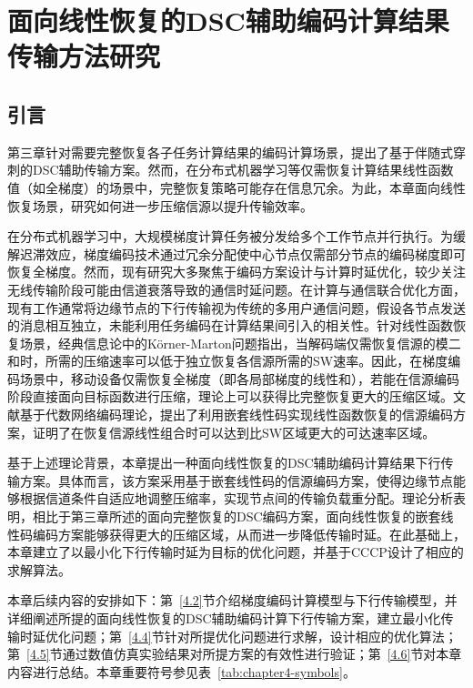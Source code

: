 \chapter{面向线性恢复的DSC辅助编码计算结果传输方法研究} \label{chapter-cooperative-transmission}

\section{引言}
第三章针对需要完整恢复各子任务计算结果的编码计算场景，提出了基于伴随式穿刺的DSC辅助传输方案。然而，在分布式机器学习等仅需恢复计算结果线性函数值（如全梯度）的场景中，完整恢复策略可能存在信息冗余。为此，本章面向线性恢复场景，研究如何进一步压缩信源以提升传输效率。

在分布式机器学习中，大规模梯度计算任务被分发给多个工作节点并行执行。为缓解迟滞效应，梯度编码技术通过冗余分配使中心节点仅需部分节点的编码梯度即可恢复全梯度。然而，现有研究大多聚焦于编码方案设计与计算时延优化，较少关注无线传输阶段可能由信道衰落导致的通信时延问题。在计算与通信联合优化方面，现有工作通常将边缘节点的下行传输视为传统的多用户通信问题，假设各节点发送的消息相互独立，未能利用任务编码在计算结果间引入的相关性。针对线性函数恢复场景，经典信息论中的Körner-Marton问题指出，当解码端仅需恢复信源的模二和时，所需的压缩速率可以低于独立恢复各信源所需的SW速率。因此，在梯度编码场景中，移动设备仅需恢复全梯度（即各局部梯度的线性和），若能在信源编码阶段直接面向目标函数进行压缩，理论上可以获得比完整恢复更大的压缩区域。文献\cite{lim2019towards}基于代数网络编码理论，提出了利用嵌套线性码实现线性函数恢复的信源编码方案，证明了在恢复信源线性组合时可以达到比SW区域更大的可达速率区域。

基于上述理论背景，本章提出一种面向线性恢复的DSC辅助编码计算结果下行传输方案。具体而言，该方案采用基于嵌套线性码的信源编码方案，使得边缘节点能够根据信道条件自适应地调整压缩率，实现节点间的传输负载重分配。理论分析表明，相比于第三章所述的面向完整恢复的DSC编码方案，面向线性恢复的嵌套线性码编码方案能够获得更大的压缩区域，从而进一步降低传输时延。在此基础上，本章建立了以最小化下行传输时延为目标的优化问题，并基于CCCP设计了相应的求解算法。

本章后续内容的安排如下：第~\ref{4.2}节介绍梯度编码计算模型与下行传输模型，并详细阐述所提的面向线性恢复的DSC辅助编码计算下行传输方案，建立最小化传输时延优化问题；第~\ref{4.4}节针对所提优化问题进行求解，设计相应的优化算法；第~\ref{4.5}节通过数值仿真实验结果对所提方案的有效性进行验证；第~\ref{4.6}节对本章内容进行总结。本章重要符号参见表~\ref{tab:chapter4-symbols}。

